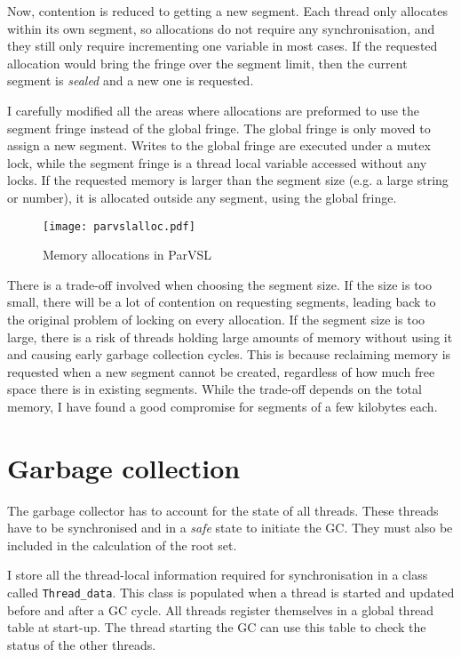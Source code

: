 Now, contention is reduced to getting a new segment. Each thread only allocates within
its own segment, so allocations do not require any synchronisation, and they still only
require incrementing one variable in most cases. If the requested allocation would bring
the fringe over the segment limit, then the current segment is \emph{sealed} and a new one is
requested.

I carefully modified all the areas where allocations are preformed to use the segment fringe
instead of the global fringe. The global fringe is only moved to assign a new segment. Writes
to the global fringe are executed under a mutex lock, while the segment fringe is a thread local
variable accessed without any locks. If the requested memory is larger than the segment size
(e.g. a large string or number), it is allocated outside any segment, using the global fringe.

\begin{figure}[H]
  \centering
  \texttt{[image: parvslalloc.pdf]}
  \label{fig:parvslalloc}
  \caption{Memory allocations in ParVSL}
\end{figure}

There is a trade-off involved when choosing the segment size. If the size is too small,
there will be a lot of contention on requesting segments, leading back to the original
problem of locking on every allocation. If the segment size is too large, there is a risk
of threads holding large amounts of memory without using it and causing early garbage collection
cycles. This is because reclaiming memory is requested when a new segment cannot be created,
regardless of how much free space there is in existing segments. While the trade-off depends on the
total memory, I have found a good compromise for segments of a few kilobytes each.

\section{Garbage collection}
\label{sec:gc}
The garbage collector has to account for the state of all threads. These threads have to be synchronised
and in a \emph{safe} state to initiate the GC. They must also be included in the calculation of the root set.

I store all the thread-local information required for synchronisation in a class called \verb|Thread_data|. This
class is populated when a thread is started and updated before and after a GC cycle. All threads register
themselves in a global thread table at start-up. The thread starting the GC can use this table to check the status
of the other threads.

